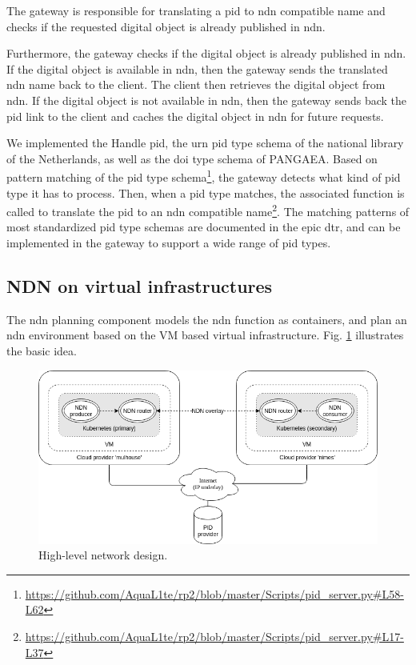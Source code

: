 \documentclass[conference]{IEEEtran}
\begin{document}
The gateway is responsible for translating a \gls{pid} to \gls{ndn} compatible name and checks if the requested digital object is already published in \gls{ndn}.

Furthermore, the gateway checks if the digital object is already published in \gls{ndn}. If the digital object is available in \gls{ndn}, then the gateway sends the translated \gls{ndn} name back to the client. The client then retrieves the digital object from \gls{ndn}. If the digital object is not available in \gls{ndn}, then the gateway sends back the \gls{pid} link to the client and caches the digital object in \gls{ndn} for future requests.

We implemented the Handle \gls{pid}, the \gls{urn} \gls{pid} type schema of the national library of the Netherlands, as well as the \gls{doi} type schema of PANGAEA. Based on pattern matching of the \gls{pid} type schema\footnote{\url{https://github.com/AquaL1te/rp2/blob/master/Scripts/pid_server.py#L58-L62}}, the gateway detects what kind of \gls{pid} type it has to process. Then, when a \gls{pid} type matches, the associated function is called to translate the \gls{pid} to an \gls{ndn} compatible name\footnote{\url{https://github.com/AquaL1te/rp2/blob/master/Scripts/pid_server.py#L17-L37}}. The matching patterns of most standardized \gls{pid} type schemas are documented in the \gls{epic} \gls{dtr}, and can be implemented in the gateway \cite{dtr} to support a wide range of \gls{pid} types. 


\subsection{NDN on virtual infrastructures}
The \gls{ndn} planning component models the \gls{ndn} function as containers, and plan an \gls{ndn} environment based on the VM based virtual infrastructure. Fig. \ref{fig:high-level-network-design} illustrates the basic idea.

\begin{figure}[H]
\centering
\includegraphics[width=\columnwidth]{images/high-level-network-design.png}
\caption{High-level network design.}
\label{fig:high-level-network-design}
\end{figure}
\end{document}
